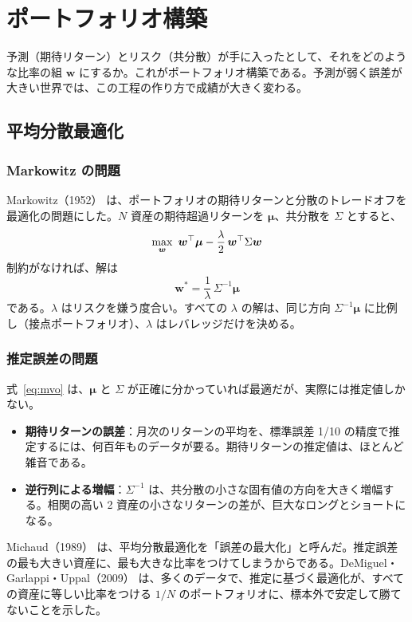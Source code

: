 \chapter{ポートフォリオ構築}
\label{ch:pc}

予測（期待リターン）とリスク（共分散）が手に入ったとして、それをどのような比率の組 $\bm w$ にするか。これがポートフォリオ構築である。予測が弱く誤差が大きい世界では、この工程の作り方で成績が大きく変わる。

\section{平均分散最適化}

\subsection{Markowitz の問題}

Markowitz（1952）\cite{markowitz1952} は、ポートフォリオの期待リターンと分散のトレードオフを最適化の問題にした。$N$ 資産の期待超過リターンを $\bm\mu$、共分散を $\Sigma$ とすると、
\begin{equation}
\max_{\bm w}\ \bm w^{\top} \bm\mu - \frac{\lambda}{2}\,\bm w^{\top} \Sigma \bm w
\end{equation}
制約がなければ、解は
\begin{equation}
\bm w^* = \frac{1}{\lambda}\,\Sigma^{-1}\bm\mu
\label{eq:mvo}
\end{equation}
である。$\lambda$ はリスクを嫌う度合い。すべての $\lambda$ の解は、同じ方向 $\Sigma^{-1}\bm\mu$ に比例し（接点ポートフォリオ）、$\lambda$ はレバレッジだけを決める。

\subsection{推定誤差の問題}

式~\eqref{eq:mvo} は、$\bm\mu$ と $\Sigma$ が正確に分かっていれば最適だが、実際には推定値しかない。

\begin{itemize}
\item \textbf{期待リターンの誤差}：月次のリターンの平均を、標準誤差 1/10 の精度で推定するには、何百年ものデータが要る。期待リターンの推定値は、ほとんど雑音である。
\item \textbf{逆行列による増幅}：$\Sigma^{-1}$ は、共分散の小さな固有値の方向を大きく増幅する。相関の高い 2 資産の小さなリターンの差が、巨大なロングとショートになる。
\end{itemize}
Michaud（1989）\cite{michaud1989} は、平均分散最適化を「誤差の最大化」と呼んだ。推定誤差の最も大きい資産に、最も大きな比率をつけてしまうからである。DeMiguel・Garlappi・Uppal（2009）\cite{dgu2009} は、多くのデータで、推定に基づく最適化が、すべての資産に等しい比率をつける $1/N$ のポートフォリオに、標本外で安定して勝てないことを示した。

